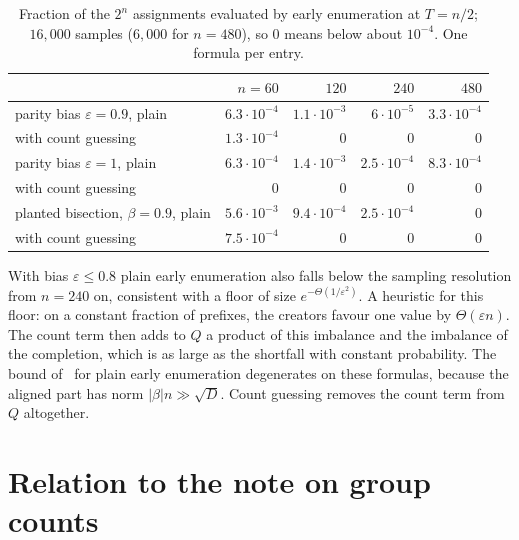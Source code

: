 \documentclass[11pt,a4paper]{article}
\theoremstyle{definition}
\theoremstyle{remark}
\begin{document}
\begin{table}[ht]
\centering
\begin{tabular}{lrrrr}
\toprule
 & $n=60$ & $120$ & $240$ & $480$\\
\midrule
parity bias $\varepsilon=0.9$, plain & $6.3\cdot10^{-4}$ & $1.1\cdot10^{-3}$ &
 $6\cdot10^{-5}$ & $3.3\cdot10^{-4}$\\
\quad with count guessing & $1.3\cdot10^{-4}$ & $0$ & $0$ & $0$\\
parity bias $\varepsilon=1$, plain & $6.3\cdot10^{-4}$ & $1.4\cdot10^{-3}$ &
 $2.5\cdot10^{-4}$ & $8.3\cdot10^{-4}$\\
\quad with count guessing & $0$ & $0$ & $0$ & $0$\\
planted bisection, $\beta=0.9$, plain & $5.6\cdot10^{-3}$ & $9.4\cdot10^{-4}$
 & $2.5\cdot10^{-4}$ & $0$\\
\quad with count guessing & $7.5\cdot10^{-4}$ & $0$ & $0$ & $0$\\
\bottomrule
\end{tabular}
\caption{Fraction of the $2^n$ assignments evaluated by early enumeration at
$T=n/2$; $16{,}000$ samples ($6{,}000$ for $n=480$), so $0$ means below about
$10^{-4}$. One formula per entry.}\label{tab:pass}
\end{table}

With bias $\varepsilon\le0.8$ plain early enumeration also falls below the
sampling resolution from $n=240$ on, consistent with a floor of size
$e^{-\Theta(1/\varepsilon^2)}$. A heuristic for this floor: on a constant
fraction of prefixes, the creators favour one value by $\Theta(\varepsilon n)$.
The count term then adds to $Q$ a product of this imbalance and the imbalance
of the completion, which is as large as the shortfall with constant
probability. The bound of~\cite{CC} for plain early enumeration
degenerates on these formulas, because the aligned part has norm
$|\beta|n\gg\sqrt D$. Count guessing removes the count term from $Q$
altogether.

\section{Relation to the note on group counts}\label{sec:relation}
\end{document}
